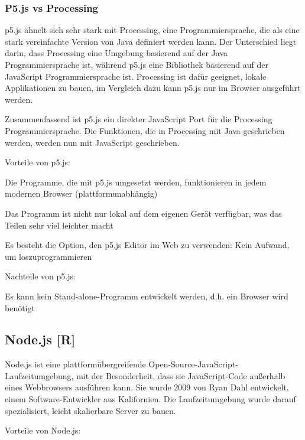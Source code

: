 \subsubsection{P5.js vs Processing}
p5.js ähnelt sich sehr stark mit Processing, eine Programmiersprache, die als eine stark vereinfachte Version von Java definiert werden kann.
Der Unterschied liegt darin, dass Processing eine Umgebung basierend auf der Java Programmiersprache ist, während p5.js eine Bibliothek basierend auf der JavaScript Programmiersprache ist.
Processing ist dafür geeignet, lokale Applikationen zu bauen, im Vergleich dazu kann p5.js nur im Browser ausgeführt werden.

Zusammenfassend ist p5.js ein direkter JavaScript Port für die Processing Programmiersprache. Die Funktionen, die in Processing mit Java geschrieben werden, werden nun mit JavaScript geschrieben. \cite{p5_proc_difference}

Vorteile von p5.js:
\begin{compactitem}
  \item Die Programme, die mit p5.js umgesetzt werden, funktionieren in jedem modernen Browser (plattformunabhängig)
  \item Das Programm ist nicht nur lokal auf dem eigenen Gerät verfügbar, was das Teilen sehr viel leichter macht
  \item Es besteht die Option, den p5.js Editor im Web zu verwenden: Kein Aufwand, um loszuprogrammieren
\end{compactitem}

Nachteile von p5.js:
\begin{compactitem}
  \item Es kann kein Stand-alone-Programm entwickelt werden, d.h. ein Browser wird benötigt
\end{compactitem}


\subsection {Node.js [R]}
Node.js ist eine plattformübergreifende Open-Source-JavaScript-Laufzeitumgebung, mit der Besonderheit, dass sie JavaScript-Code außerhalb eines Webbrowsers ausführen kann.
Sie wurde 2009 von Ryan Dahl entwickelt, einem Software-Entwickler aus Kalifornien.
Die Laufzeitumgebung wurde darauf spezialisiert, leicht skalierbare Server zu bauen. \cite{nodejs}

Vorteile von Node.js: \cite{nodejs_vorteile}

